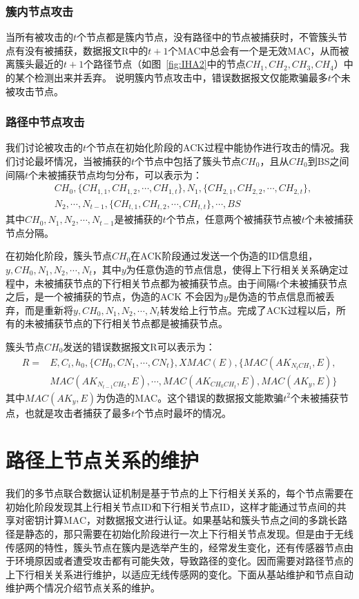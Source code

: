 \subsubsection{簇内节点攻击}
当所有被攻击的$t$个节点都是簇内节点，没有路径中的节点被捕获时，不管簇头节点有没有被捕获，数据报文R中的$t+1$个MAC中总会有一个是无效MAC，从而被离簇头最近的$t+1$个路径节点（如图~\ref{fig:IHA2}中的节点$CH_1,CH_2,CH_3,CH_4$）中的某个检测出来并丢弃。
说明簇内节点攻击中，错误数据报文仅能欺骗最多$t$个未被攻击节点。

\subsubsection{路径中节点攻击}
我们讨论被攻击的$t$个节点在初始化阶段的ACK过程中能协作进行攻击的情况。我们讨论最坏情况，当被捕获的$t$个节点中包括了簇头节点$CH_0$，且从$CH_0$到BS之间间隔$t$个未被捕获节点均匀分布，可以表示为：
\begin{equation}
\begin{split}
  & CH_0,\{CH_{1,1},CH_{1,2},\cdots,CH_{1,t}\},N_1,\{CH_{2,1},CH_{2,2},\cdots,CH_{2,t}\},\\
  & N_2,\cdots,N_{t-1},\{CH_{t,1},CH_{t,2},\cdots,CH_{t,t}\},\cdots,BS
\end{split}
\end{equation}
其中$CH_0,N_1,N_2,\cdots,N_{t-1}$是被捕获的$t$个节点，任意两个被捕获节点被$t$个未被捕获节点分隔。

在初始化阶段，簇头节点$CH_0$在ACK阶段通过发送一个伪造的ID信息组，$y,CH_0,N_1,N_2,\cdots,N_t$，其中$y$为任意伪造的节点信息，使得上下行相关关系确定过程中，未被捕获节点的下行相关节点都为被捕获节点。由于间隔$t$个未被捕获节点之后，是一个被捕获的节点，伪造的ACK 不会因为$y$是伪造的节点信息而被丢弃，而是重新将$y,CH_0,N_1,N_2,\cdots,N_t$转发给上行节点。完成了ACK过程以后，所有的未被捕获节点的下行相关节点都是被捕获节点。

簇头节点$CH_0$发送的错误数据报文R可以表示为：
\begin{equation}\label{report}
\begin{split}
  R=
  & E,C_i,h_0,\{CH_0,CN_1,\cdots,CN_t\},XMAC(E),\{MAC(AK_{N_t CH_1},E),\\
  & MAC(AK_{N_{t-1} CH_2},E),\cdots,MAC(AK_{CH_0 CH_t},E),MAC(AK_y,E)\}
\end{split}
\end{equation}
其中$MAC(AK_y,E)$为伪造的MAC。这个错误的数据报文能欺骗$t^2$个未被捕获节点，也就是攻击者捕获了最多$t$个节点时最坏的情况。
\section{路径上节点关系的维护}
我们的多节点联合数据认证机制是基于节点的上下行相关关系的，每个节点需要在初始化阶段发现其上行相关节点ID和下行相关节点ID，这样才能通过节点间的共享对密钥计算MAC，对数据报文进行认证。如果基站和簇头节点之间的多跳长路径是静态的，那只需要在初始化阶段进行一次上下行相关节点发现。但是由于无线传感网的特性，簇头节点在簇内是选举产生的，经常发生变化，还有传感器节点由于环境原因或者遭受攻击都有可能失效，导致路径的变化。因而需要对路径节点的上下行相关关系进行维护，以适应无线传感网的变化。下面从基站维护和节点自动维护两个情况介绍节点关系的维护。
